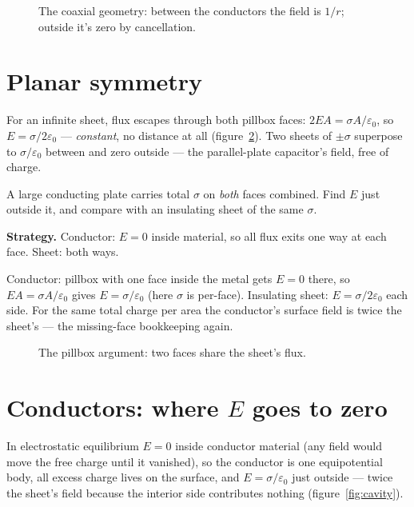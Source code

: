 \begin{figure}[htbp]\centering

\caption{The coaxial geometry: between the conductors the field is
$1/r$; outside it's zero by cancellation.}
\label{fig:coax}
\end{figure}

\section{Planar symmetry}\label{sec:ga-plane}

For an infinite sheet, flux escapes through both pillbox faces:
$2EA=\sigma A/\varepsilon_0$, so $E=\sigma/2\varepsilon_0$ ---
\emph{constant}, no distance at all (figure~\ref{fig:pill}). Two sheets
of $\pm\sigma$ superpose to $\sigma/\varepsilon_0$ between and zero
outside --- the parallel-plate capacitor's field, free of charge.

\begin{example}\label{ex:sheet}
A large conducting plate carries total $\sigma$ on \emph{both} faces
combined. Find $E$ just outside it, and compare with an insulating
sheet of the same $\sigma$.
\par\smallskip
\textbf{Strategy.} Conductor: $E=0$ inside material, so all flux exits
one way at each face. Sheet: both ways.
\begin{solution}
Conductor: pillbox with one face inside the metal gets $E=0$ there, so
$EA=\sigma A/\varepsilon_0$ gives $E=\sigma/\varepsilon_0$ (here
$\sigma$ is per-face). Insulating sheet: $E=\sigma/2\varepsilon_0$
each side. For the same total charge per area the conductor's surface
field is twice the sheet's --- the missing-face bookkeeping again.
\checkmark
\end{solution}
\end{example}

\begin{figure}[htbp]\centering

\caption{The pillbox argument: two faces share the sheet's flux.}
\label{fig:pill}
\end{figure}

\section{Conductors: where $E$ goes to zero}\label{sec:ga-cond}

In electrostatic equilibrium $E=0$ inside conductor material (any field
would move the free charge until it vanished), so the conductor is one
equipotential body, all excess charge lives on the surface, and
$E=\sigma/\varepsilon_0$ just outside --- twice the sheet's field
because the interior side contributes nothing
(figure~\ref{fig:cavity}).

